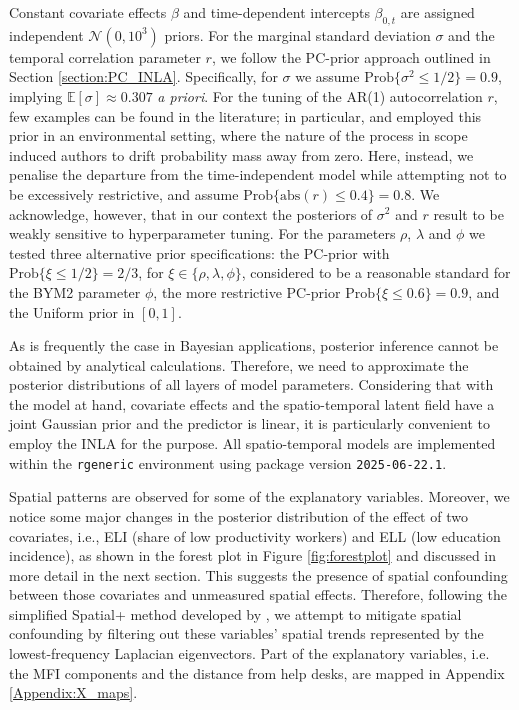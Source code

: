 \documentclass[openany, 11pt, oneside]{book}
\begin{document}
Constant covariate effects $\beta$ and time-dependent intercepts $\beta_{0,t}$ are assigned independent $\mathcal{N}(0, 10^3)$ priors. 
%
For the marginal standard deviation $\sigma$ and the temporal correlation parameter $r$, we follow the PC-prior approach outlined in Section \ref{section:PC_INLA}. Specifically, for $\sigma$ we assume $\mathrm{Prob} \lbrace \sigma^2 \leq 1/2 \rbrace= 0.9$, implying $\mathbb{E}[\sigma] \approx 0.307$ \textit{a priori}. 
% 
For the tuning of the AR(1) autocorrelation $r$, few examples can be found in the literature; in particular, \cite{fioravanti2021spatio} and \cite{franco2019unified} employed this prior in an environmental setting, where the nature of the process in scope induced authors to drift probability mass away from zero. Here, instead, we penalise the departure from the time-independent model while attempting not to be excessively restrictive, and assume $\mathrm{Prob} \lbrace \mathrm{abs}( r ) \leq 0.4\rbrace= 0.8$. We acknowledge, however, that in our context the posteriors of $\sigma^2$ and $r$ result to be weakly sensitive to hyperparameter tuning.
% 
For the parameters $\rho$, $\lambda$ and $\phi$ we tested three alternative prior specifications: the PC-prior with $\mathrm{Prob} \lbrace \xi \leq 1/2 \rbrace=2/3$, for $\xi \in \lbrace\rho, \lambda, \phi \rbrace $, considered to be a reasonable standard for the BYM2 parameter $\phi$, the more restrictive PC-prior $\mathrm{Prob} \lbrace \xi \leq 0.6 \rbrace=0.9$, and the Uniform prior in $[0,1]$.

 As is frequently the case in Bayesian applications, posterior inference cannot be obtained by analytical calculations. Therefore, we need to approximate the posterior distributions of all layers of model parameters. Considering that with the model at hand, covariate effects and the spatio-temporal latent field have a joint Gaussian prior and the predictor is linear, it is particularly convenient to employ the INLA for the purpose. All spatio-temporal models are implemented within the \texttt{rgeneric} environment \parencite[][Chapter 11]{INLAbook} using package version \texttt{2025-06-22.1}.

Spatial patterns are observed for some of the explanatory variables. Moreover, we notice some major changes in the posterior distribution of the effect of two covariates, i.e., ELI (share of low productivity workers) and ELL (low education incidence), as shown in the forest plot in Figure \ref{fig:forestplot} and discussed in more detail in the next section. This suggests the presence of spatial confounding between those covariates and unmeasured spatial effects. Therefore, following the simplified Spatial+ method developed by \cite{Urdangarin24}, we attempt to mitigate spatial confounding by filtering out these variables' spatial trends represented by the lowest-frequency Laplacian eigenvectors. Part of the explanatory variables, i.e. the MFI components and the distance from help desks, are mapped in Appendix \ref{Appendix:X_maps}.
\end{document}
